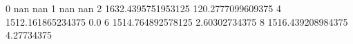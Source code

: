 0 nan nan
1 nan nan
2 1632.4395751953125 120.2777099609375
4 1512.161865234375 0.0
6 1514.764892578125 2.60302734375
8 1516.439208984375 4.27734375
